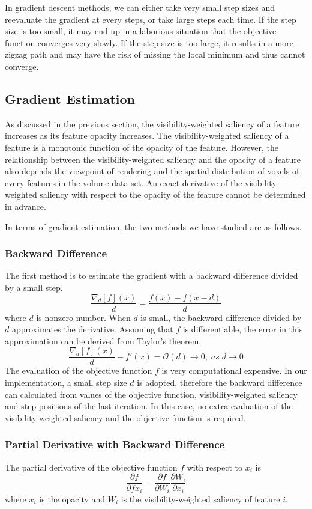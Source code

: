 In gradient descent methods, we can either take very small step sizes and reevaluate the gradient at every steps, or take large steps each time. If the step size is too small, it may end up in a laborious situation that the objective function converges very slowly. If the step size is too large, it results in a more zigzag path and may have the risk of missing the local minimum and thus cannot converge.

\subsection{Gradient Estimation}
As discussed in the previous section, the visibility-weighted saliency of a feature increases as its feature opacity increases. The visibility-weighted saliency of a feature is a monotonic function of the opacity of the feature. However, the relationship between the visibility-weighted saliency and the opacity of a feature also depends the viewpoint of rendering and the spatial distribution of voxels of every features in the volume data set. An exact derivative of the visibility-weighted saliency with respect to the opacity of the feature cannot be determined in advance.

In terms of gradient estimation, the two methods we have studied are as follows.

\subsubsection{Backward Difference}
The first method is to estimate the gradient with a backward difference divided by a small step.
\[ \frac{\nabla_{d}[f](x)}{d}=\frac{f(x)-f(x-d)}{d} \]
where $ d $ is nonzero number.
When $ d $ is small, the backward difference divided by $ d $ approximates the derivative. Assuming that $ f $ is differentiable, the error in this approximation can be derived from Taylor's theorem.
\[ \frac{\nabla_{d}[f](x)}{d}-f'(x)=\mathcal{O}(d) \to 0 , \; as \; d \to 0 \]
The evaluation of the objective function $ f $ is very computational expensive. In our implementation, a small step size $ d $ is adopted, therefore the backward difference can calculated from values of the objective function, visibility-weighted saliency and step positions of the last iteration. In this case, no extra evaluation of the visibility-weighted saliency and the objective function is required.

\subsubsection{Partial Derivative with Backward Difference}
The partial derivative of the objective function $ f $ with respect to $ x_{i} $ is
\[ \frac{\partial f}{\partial f x_{i}} = \frac{\partial f}{\partial W_{i}} \frac{\partial W_{i}}{\partial x_{i}} \]
where $ x_{i} $ is the opacity and $ W_{i} $ is the visibility-weighted saliency of feature $ i $.

